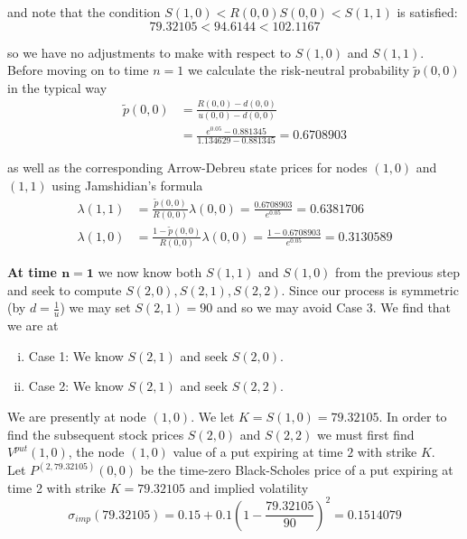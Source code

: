 \documentclass[12pt]{article}
\newlength\tindent
\renewcommand{\indent}{\hspace*{\tindent}}
\begin{document}
and note that the condition $S(1,0) < R(0,0)S(0,0) < S(1,1)$ is satisfied:
\begin{equation*}
	79.32105 < 94.6144 < 102.1167
\end{equation*}

so we have no adjustments to make with respect to $S(1,0)$ and $S(1,1)$. \\

\indent Before moving on to time $n = 1$ we calculate the risk-neutral probability $\tilde{p}(0,0)$ in the typical way
\begin{align*}
	\tilde{p}(0,0) &= \frac{ R(0,0) - d(0,0) }{ u(0,0) - d(0,0) } \\
	&= \frac{ e^{0.05} - 0.881345 }{ 1.134629 - 0.881345 } = 0.6708903
\end{align*}

as well as the corresponding Arrow-Debreu state prices for nodes $(1,0)$ and $(1,1)$ using Jamshidian's formula
\begin{align*}
	\lambda(1,1) &= \frac{ \tilde{p}(0,0) }{ R(0,0) } \lambda(0,0) = \frac{ 0.6708903 }{ e^{0.05} } = 0.6381706 \\
	\lambda(1,0) &= \frac{ 1 - \tilde{p}(0,0) }{ R(0,0) } \lambda(0,0) = \frac{ 1 - 0.6708903 }{ e^0.05 } = 0.3130589
\end{align*}

{\bf At time $\bm{n = 1}$} we now know both $S(1,1)$ and $S(1,0)$ from the previous step and seek to compute $S(2,0), S(2,1), S(2,2)$. Since our process is symmetric (by $d = \frac{1}{u}$) we may set $S(2,1) = 90$ and so we may avoid Case 3. We find that we are at
\begin{enumerate}[(i)]
	\item Case 1: We know $S(2,1)$ and seek $S(2,0)$.
	\item Case 2: We know $S(2,1)$ and seek $S(2,2)$.
\end{enumerate}

\indent We are presently at node $(1,0)$. We let $K = S(1,0) = 79.32105$. In order to find the subsequent stock prices $S(2,0)$ and $S(2,2)$ we must first find $V^{put}(1,0)$, the node $(1,0)$ value of a put expiring at time $2$ with strike $K$. \\

\indent Let $P^{(2,79.32105)}(0,0)$ be the time-zero Black-Scholes price of a put expiring at time 2 with strike $K = 79.32105$ and implied volatility
\begin{equation*}
	\sigma_{imp}(79.32105) = 0.15 + 0.1 \left( 1 - \frac{79.32105}{90} \right)^2 = 0.1514079
\end{equation*}
\end{document}
